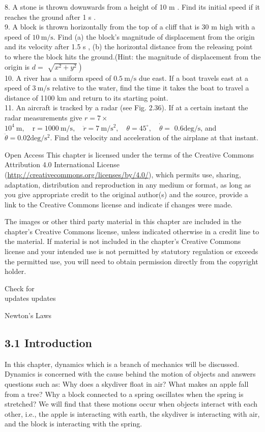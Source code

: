 \documentclass[10pt]{article}
\begin{document}
8. A stone is thrown downwards from a height of 10 m . Find its initial speed if it reaches the ground after 1 s .\\
9. A block is thrown horizontally from the top of a cliff that is 30 m high with a speed of $10 \mathrm{~m} / \mathrm{s}$. Find (a) the block's magnitude of displacement from the origin and its velocity after 1.5 s , (b) the horizontal distance from the releasing point to where the block hits the ground.(Hint: the magnitude of displacement from the origin is $d=$ $\left.\sqrt{x^{2}+y^{2}}\right)$\\
10. A river has a uniform speed of $0.5 \mathrm{~m} / \mathrm{s}$ due east. If a boat travels east at a speed of $3 \mathrm{~m} / \mathrm{s}$ relative to the water, find the time it takes the boat to travel a distance of 1100 km and return to its starting point.\\
11. An aircraft is tracked by a radar (see Fig. 2.36). If at a certain instant the radar measurements give $r=7 \times$ $10^{4} \mathrm{~m}, \quad \mathrm{r}=1000 \mathrm{~m} / \mathrm{s}, \quad \ddot{r}=7 \mathrm{~m} / \mathrm{s}^{2}, \quad \theta=45^{\circ}, \quad \dot{\theta}=$ $0.6 \mathrm{deg} / \mathrm{s}$, and $\ddot{\theta}=0.02 \mathrm{deg} / \mathrm{s}^{2}$. Find the velocity and acceleration of the airplane at that instant.

Open Access This chapter is licensed under the terms of the Creative Commons Attribution 4.0 International License (\href{http://creativecommons.org/licenses/by/4.0/}{http://creativecommons.org/licenses/by/4.0/}), which permits use, sharing, adaptation, distribution and reproduction in any medium or format, as long as you give appropriate credit to the original author(s) and the source, provide a link to the Creative Commons license and indicate if changes were made.

The images or other third party material in this chapter are included in the chapter's Creative Commons license, unless indicated otherwise in a credit line to the material. If material is not included in the chapter's Creative Commons license and your intended use is not permitted by statutory regulation or exceeds the permitted use, you will need to obtain permission directly from the copyright holder.

Check for\\
updates updates

Newton's Laws

\subsection*{3.1 Introduction}
In this chapter, dynamics which is a branch of mechanics will be discussed. Dynamics is concerned with the cause behind the motion of objects and answers questions such as: Why does a skydiver float in air? What makes an apple fall from a tree? Why a block connected to a spring oscillates when the spring is stretched? We will find that these motions occur when objects interact with each other, i.e., the apple is interacting with earth, the skydiver is interacting with air, and the block is interacting with the spring.
\end{document}
